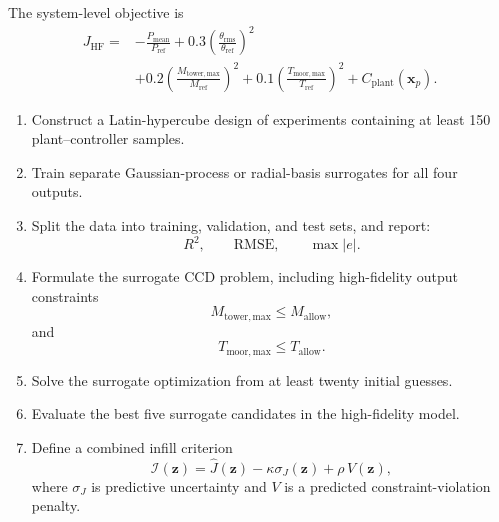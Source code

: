 The system-level objective is
\begin{align}
J_{\mathrm{HF}}
=&
-
\frac{P_{\mathrm{mean}}}{P_{\mathrm{ref}}}
+
0.3
\left(
\frac{\theta_{\mathrm{rms}}}{\theta_{\mathrm{ref}}}
\right)^2
\nonumber\\
&+
0.2
\left(
\frac{M_{\mathrm{tower,max}}}{M_{\mathrm{ref}}}
\right)^2
+
0.1
\left(
\frac{T_{\mathrm{moor,max}}}{T_{\mathrm{ref}}}
\right)^2
+
C_{\mathrm{plant}}(\mathbf{x}_p).
\end{align}

\begin{enumerate}
    \item Construct a Latin-hypercube design of experiments containing at
    least 150 plant--controller samples.

    \item Train separate Gaussian-process or radial-basis surrogates for all
    four outputs.

    \item Split the data into training, validation, and test sets, and report:
    \begin{equation}
    R^2,
    \qquad
    \mathrm{RMSE},
    \qquad
    \max|e|.
    \end{equation}

    \item Formulate the surrogate CCD problem, including high-fidelity output
    constraints
    \begin{equation}
    M_{\mathrm{tower,max}}\leq M_{\mathrm{allow}},
    \end{equation}
    and
    \begin{equation}
    T_{\mathrm{moor,max}}\leq T_{\mathrm{allow}}.
    \end{equation}

    \item Solve the surrogate optimization from at least twenty initial
    guesses.

    \item Evaluate the best five surrogate candidates in the high-fidelity
    model.

    \item Define a combined infill criterion
    \begin{equation}
    \mathcal{I}(\mathbf{z})
    =
    \widehat{J}(\mathbf{z})
    -
    \kappa\sigma_J(\mathbf{z})
    +
    \rho\,V(\mathbf{z}),
    \end{equation}
    where $\sigma_J$ is predictive uncertainty and $V$ is a predicted
    constraint-violation penalty.


\end{enumerate}
